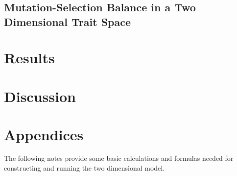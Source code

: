 \documentclass{article}
\begin{document}
\subsection*{Mutation-Selection Balance in a Two Dimensional Trait Space}

\section*{Results}

\section*{Discussion}

\section*{Appendices}
The following notes provide some basic calculations and formulas needed for constructing and running the two dimensional model.
\end{document}
